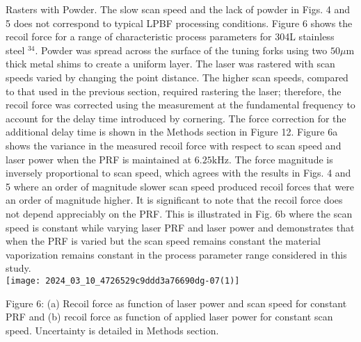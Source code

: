 \documentclass[10pt]{article}
\begin{document}
Rasters with Powder. The slow scan speed and the lack of powder in Figs. 4 and 5 does not correspond to typical LPBF processing conditions. Figure 6 shows the recoil force for a range of characteristic process parameters for 304L stainless steel ${ }^{34}$. Powder was spread across the surface of the tuning forks using two $50 \mu \mathrm{m}$ thick metal shims to create a uniform layer. The laser was rastered with scan speeds varied by changing the point distance. The higher scan speeds, compared to that used in the previous section, required rastering the laser; therefore, the recoil force was corrected using the measurement at the fundamental frequency to account for the delay time introduced by cornering. The force correction for the additional delay time is shown in the Methods section in Figure 12. Figure 6a shows the variance in the measured recoil force with respect to scan speed and laser power when the PRF is maintained at $6.25 \mathrm{kHz}$. The force magnitude is inversely proportional to scan speed, which agrees with the results in Figs. 4 and 5 where an order of magnitude slower scan speed produced recoil forces that were an order of magnitude higher. It is significant to note that the recoil force does not depend appreciably on the PRF. This is illustrated in Fig. 6b where the scan speed is constant while varying laser PRF and laser power and demonstrates that when the PRF is varied but the scan speed remains constant the material vaporization remains constant in the process parameter range considered in this study.\\
\texttt{[image: 2024\_03\_10\_4726529c9ddd3a76690dg-07(1)]}

Figure 6: (a) Recoil force as function of laser power and scan speed for constant PRF and (b) recoil force as function of applied laser power for constant scan speed. Uncertainty is detailed in Methods section.
\end{document}
